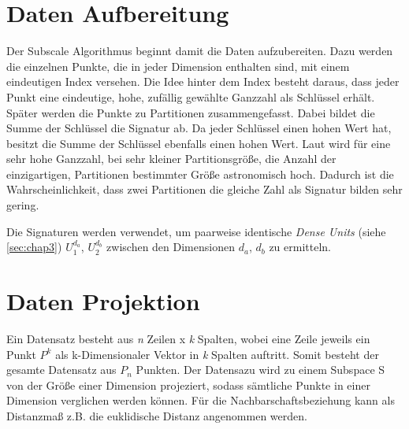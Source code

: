 \section{Daten Aufbereitung}

Der Subscale Algorithmus beginnt damit die Daten aufzubereiten. Dazu werden die einzelnen Punkte,
die in jeder Dimension enthalten sind, mit einem eindeutigen Index versehen. Die Idee hinter dem
Index besteht daraus, dass jeder Punkt eine eindeutige, hohe, zufällig gewählte Ganzzahl als
Schlüssel erhält. Später werden die Punkte zu Partitionen zusammengefasst. Dabei bildet die Summe
der Schlüssel die Signatur ab. Da jeder Schlüssel einen hohen Wert hat, besitzt die Summe der
Schlüssel ebenfalls einen hohen Wert. Laut \cite{7022654} wird für eine sehr hohe Ganzzahl, bei
sehr kleiner
Partitionsgröße, die Anzahl der einzigartigen, Partitionen bestimmter Größe astronomisch hoch.
Dadurch ist die Wahrscheinlichkeit, dass zwei Partitionen die gleiche Zahl als Signatur bilden
sehr gering.

Die Signaturen werden verwendet, um paarweise identische \emph{Dense Units} (siehe
\ref{sec:chap3}) $U_1^{d_a}$, $U_2^{d_b}$ zwischen den Dimensionen $d_a$, $d_b$ zu ermitteln.


\section{Daten Projektion}

Ein Datensatz besteht aus \emph{n} Zeilen x \emph{k} Spalten, wobei eine Zeile jeweils ein Punkt
$P^{k}$ als k-Dimensionaler Vektor in \emph{k} Spalten auftritt. Somit besteht der gesamte
Datensatz aus $P_{n}$ Punkten.
Der Datensazu wird zu einem Subspace S von der Größe einer Dimension projeziert, sodass sämtliche
Punkte in einer Dimension verglichen werden können. Für die Nachbarschaftsbeziehung kann als
Distanzmaß z.B. die euklidische Distanz angenommen werden.
